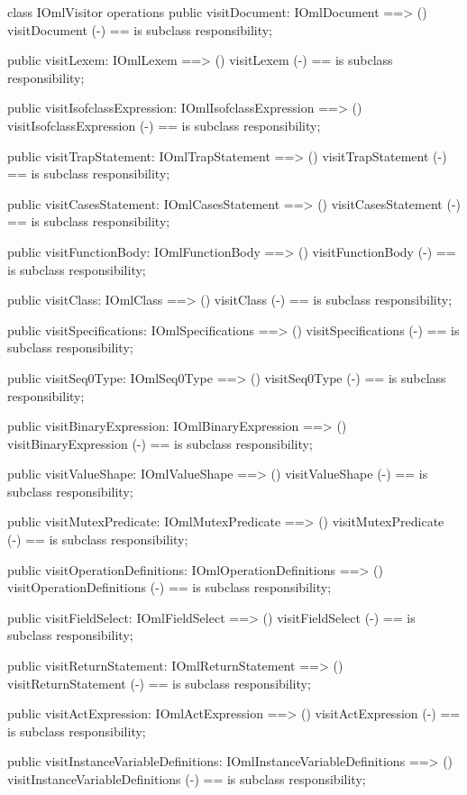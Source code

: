 \begin{vdm_al}
class IOmlVisitor
operations
  public visitDocument: IOmlDocument ==> ()
  visitDocument (-) == is subclass responsibility;

  public visitLexem: IOmlLexem ==> ()
  visitLexem (-) == is subclass responsibility;

  public visitIsofclassExpression: IOmlIsofclassExpression ==> ()
  visitIsofclassExpression (-) == is subclass responsibility;

  public visitTrapStatement: IOmlTrapStatement ==> ()
  visitTrapStatement (-) == is subclass responsibility;

  public visitCasesStatement: IOmlCasesStatement ==> ()
  visitCasesStatement (-) == is subclass responsibility;

  public visitFunctionBody: IOmlFunctionBody ==> ()
  visitFunctionBody (-) == is subclass responsibility;

  public visitClass: IOmlClass ==> ()
  visitClass (-) == is subclass responsibility;

  public visitSpecifications: IOmlSpecifications ==> ()
  visitSpecifications (-) == is subclass responsibility;

  public visitSeq0Type: IOmlSeq0Type ==> ()
  visitSeq0Type (-) == is subclass responsibility;

  public visitBinaryExpression: IOmlBinaryExpression ==> ()
  visitBinaryExpression (-) == is subclass responsibility;

  public visitValueShape: IOmlValueShape ==> ()
  visitValueShape (-) == is subclass responsibility;

  public visitMutexPredicate: IOmlMutexPredicate ==> ()
  visitMutexPredicate (-) == is subclass responsibility;

  public visitOperationDefinitions: IOmlOperationDefinitions ==> ()
  visitOperationDefinitions (-) == is subclass responsibility;

  public visitFieldSelect: IOmlFieldSelect ==> ()
  visitFieldSelect (-) == is subclass responsibility;

  public visitReturnStatement: IOmlReturnStatement ==> ()
  visitReturnStatement (-) == is subclass responsibility;

  public visitActExpression: IOmlActExpression ==> ()
  visitActExpression (-) == is subclass responsibility;

  public visitInstanceVariableDefinitions: IOmlInstanceVariableDefinitions ==> ()
  visitInstanceVariableDefinitions (-) == is subclass responsibility;


\end{vdm_al}
